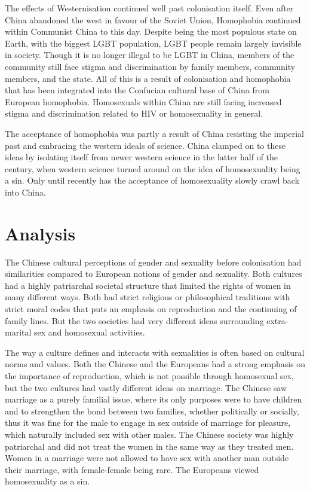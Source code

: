 The effects of Westernisation continued well past colonisation itself. Even after China abandoned the west in favour of the Soviet Union, Homophobia continued within Communist China to this day. Despite being the most populous state on Earth, with the biggest LGBT population, LGBT people remain largely invisible in society. Though it is no longer illegal to be LGBT in China, members of the community still face stigma and discrimination by family members, community members, and the state\Autocite{wang2020mapping}. All of this is a result of colonisation and homophobia that has been integrated into the Confucian cultural base of China from European homophobia. Homosexuals within China are still facing increased stigma and discrimination related to HIV or homosexuality in general.

The acceptance of homophobia was partly a result of China resisting the imperial past and embracing the western ideals of science. China clamped on to these ideas by isolating itself from newer western science in the latter half of the  century, when western science turned around on the idea of homosexuality being a sin. Only until recently has the acceptance of homosexuality slowly crawl back into China.

\section{Analysis}

The Chinese cultural perceptions of gender and sexuality before colonisation had similarities compared to European notions of gender and sexuality. Both cultures had a highly patriarchal societal structure that limited the rights of women in many different ways. Both had strict religious or philosophical traditions with strict moral codes that puts an emphasis on reproduction and the continuing of family lines. But the two societies had very different ideas surrounding extra-marital sex and homosexual activities.

The way a culture defines and interacts with sexualities is often based on cultural norms and values. Both the Chinese and the Europeans had a strong emphasis on the importance of reproduction, which is not possible through homosexual sex, but the two cultures had vastly different ideas on marriage. The Chinese saw marriage as a purely familial issue, where its only purposes were to have children and to strengthen the bond between two families, whether politically or socially, thus it was fine for the male to engage in sex outside of marriage for pleasure, which naturally included sex with other males. The Chinese society was highly patriarchal and did not treat the women in the same way as they treated men. Women in a marriage were not allowed to have sex with another man outside their marriage, with female-female being rare. The Europeans viewed homosexuality as a sin.

